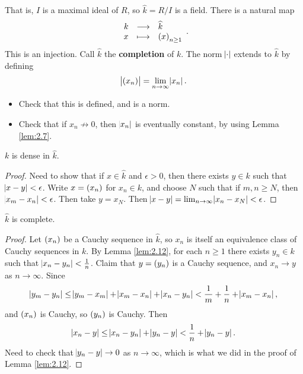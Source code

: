 That is, $ I $ is a maximal ideal of $ R $, so $ \widehat{k} = R / I $ is a field. There is a natural map
$$ \function{k}{\widehat{k}}{x}{\br{x}_{n \ge 1}}. $$
This is an injection. Call $ \widehat{k} $ the \textbf{completion} of $ k $. The norm $ \abs{\cdot} $ extends to $ \widehat{k} $ by defining
$$ \abs{\br{x_n}} = \lim_{n \to \infty} \abs{x_n}. $$

\begin{exercise*}
\hfill
\begin{itemize}
\item Check that this is defined, and is a norm.
\item Check that if $ x_n \not\to 0 $, then $ \abs{x_n} $ is eventually constant, by using Lemma \ref{lem:2.7}.
\end{itemize}
\end{exercise*}

\pagebreak

\begin{lemma}
\label{lem:2.12}
$ k $ is dense in $ \widehat{k} $.
\end{lemma}

\begin{proof}
Need to show that if $ x \in \widehat{k} $ and $ \epsilon > 0 $, then there exists $ y \in k $ such that $ \abs{x - y} < \epsilon $. Write $ x = \br{x_n} $ for $ x_n \in k $, and choose $ N $ such that if $ m, n \ge N $, then $ \abs{x_m - x_n} < \epsilon $. Then take $ y = x_N $. Then $ \abs{x - y} = \lim_{n \to \infty} \abs{x_n - x_N} < \epsilon $.
\end{proof}

\begin{lemma}
$ \widehat{k} $ is complete.
\end{lemma}

\begin{proof}
Let $ \br{x_n} $ be a Cauchy sequence in $ \widehat{k} $, so $ x_n $ is itself an equivalence class of Cauchy sequences in $ k $. By Lemma \ref{lem:2.12}, for each $ n \ge 1 $ there exists $ y_n \in k $ such that $ \abs{x_n - y_n} < \tfrac{1}{n} $. Claim that $ y = \br{y_n} $ is a Cauchy sequence, and $ x_n \to y $ as $ n \to \infty $. Since
$$ \abs{y_m - y_n} \le \abs{y_m - x_m} + \abs{x_m - x_n} + \abs{x_n - y_n} < \dfrac{1}{m} + \dfrac{1}{n} + \abs{x_m - x_n}, $$
and $ \br{x_n} $ is Cauchy, so $ \br{y_n} $ is Cauchy. Then
$$ \abs{x_n - y} \le \abs{x_n - y_n} + \abs{y_n - y} < \dfrac{1}{n} + \abs{y_n - y}. $$
Need to check that $ \abs{y_n - y} \to 0 $ as $ n \to \infty $, which is what we did in the proof of Lemma \ref{lem:2.12}.
\end{proof}

